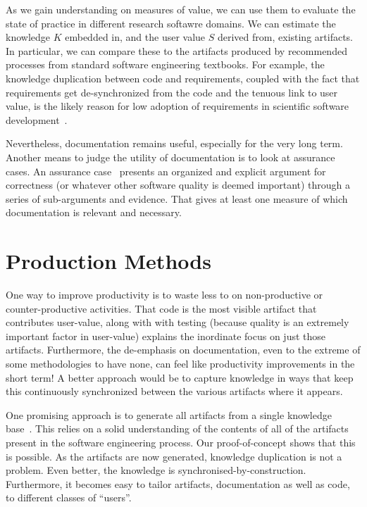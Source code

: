 \documentclass[sigconf, authorversion, nonacm]{acmart}
\begin{document}
As we gain understanding on measures of value, we can use them to evaluate the
state of practice in different research softawre domains. We can estimate the
knowledge $K$ embedded in, and the user value $S$ derived from, existing
artifacts. In particular, we can compare these to the artifacts produced by
recommended processes from standard software engineering textbooks. For example,
the knowledge duplication between code and requirements, coupled with the fact
that requirements get de-synchronized from the code and the tenuous link to
user value, is the likely reason for low adoption of requirements in
scientific software development~\cite{HeatonAndCarver2015}.

Nevertheless, documentation remains useful, especially for the very long
term. Another means to judge the utility of documentation is to look at
assurance cases. An assurance case~\cite{RinehartEtAl2015} presents an
organized and explicit argument for correctness (or whatever other software
quality is deemed important) through a series of sub-arguments and evidence.
That gives at least one measure of which documentation is relevant and
necessary.

\section{Production Methods}

One way to improve productivity is to waste less to on non-productive or
counter-productive activities. That code is the most visible artifact that
contributes user-value, along with with testing (because quality is an
extremely important factor in user-value) explains the inordinate focus
on just those artifacts. Furthermore, the de-emphasis on documentation, even to
the extreme of some methodologies to have none, can feel like productivity
improvements in the short term!  A better approach would be to capture
knowledge in ways that keep this continuously synchronized between the
various artifacts where it appears.

One promising approach is to generate all artifacts from a single
knowledge base~\cite{SzymczakEtAl2016}.  This relies on a solid understanding
of the contents of all of the artifacts present in the software engineering
process. Our proof-of-concept shows that this is possible. As the artifacts
are now generated, knowledge duplication is not a problem. Even better, the
knowledge is synchronised-by-construction. Furthermore, it becomes easy to
tailor artifacts, documentation as well as code, to different classes of
``users''. 
\end{document}
